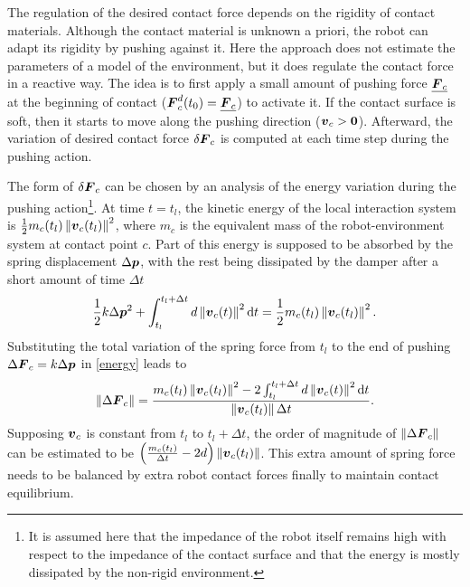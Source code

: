 \documentclass[letterpaper, 10 pt, conference]{ieeeconf}  %
\newcommand{\vect}[1]{\mbox{\boldmath${#1}$}}%
\begin{document}
The regulation of the desired contact force depends on the rigidity of contact materials. Although the contact material is unknown a priori, the robot can adapt its rigidity by pushing against it. Here the approach does not estimate the parameters of a  model of the environment, but it does regulate the contact force in a reactive way.  The idea is to first apply a small amount of pushing force $\underline{\vect{F}_c}$ at the beginning of contact ($\vect{F}_c^d(t_0)=\underline{\vect{F}_c}$) to activate it. If the contact surface is soft, then it starts to move along the pushing direction ($\vect{v}_c>\vect{0}$). Afterward, the variation of desired contact force $\delta\vect{F}_c$ is computed at each time step during the pushing action. 

The form of $\delta\vect{F}_c$ can be chosen by an analysis of the energy variation during the pushing action\footnote{It is assumed here that the impedance of the robot itself remains high with respect to the impedance of the contact surface and that the energy is mostly dissipated by the non-rigid environment.}. At time $t=t_l$, the kinetic energy of the local interaction system is $\frac{1}{2}m_c(t_l) \left\Vert\vect{v}_c(t_l)\right\Vert^2$, where $m_c$ is the equivalent mass of the robot-environment system at contact point $c$. Part of this energy is supposed to be absorbed by the spring displacement $\Delta \vect{p}$, with the rest being dissipated by the damper after a short amount of time $\Delta t$
\begin{equation}
\frac{1}{2}k\Delta \vect{p}^2 + \int_{t_l}^{t_l+\Delta t} d \left\Vert\vect{v}_c(t)\right\Vert^2 \mathrm{d}t =  \frac{1}{2} m_c(t_l) \left\Vert\vect{v}_c(t_l)\right\Vert^2.\label{energy}
\end{equation}
Substituting the total variation of the spring force from $t_l$ to the end of pushing
$\Delta \vect{F}_c = k\Delta \vect{p}$ in \eqref{energy} leads to
\begin{equation}
\left\Vert\Delta \vect{F}_c\right\Vert = \frac{m_c(t_l) \left\Vert\vect{v}_c(t_l)\right\Vert^2 -2\int_{t_l}^{t_l+\Delta t} d \left\Vert\vect{v}_c(t)\right\Vert^2 \mathrm{d}t}{\left\Vert\vect{v}_c(t_l)\right\Vert\Delta t}.
\end{equation}
Supposing $\vect{v}_c$ is constant from $t_l$ to $t_l+\Delta t$, the order of magnitude of $\left\Vert\Delta \vect{F}_c\right\Vert$ can be estimated to be $\left(\frac{m_c(t_l)}{\Delta t}-2d\right)\left\Vert\vect{v}_c(t_l)\right\Vert$.
This extra amount of spring force needs to be balanced by extra robot contact forces finally to maintain contact equilibrium.
\end{document}
